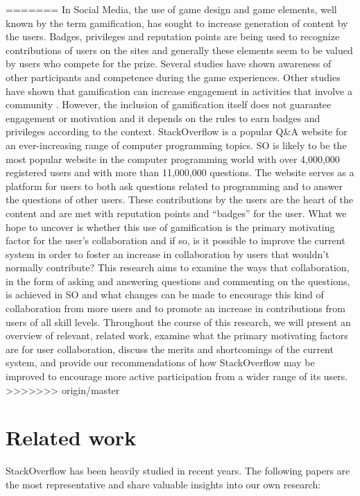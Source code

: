 \documentclass{sigchi}
\begin{document}
=======
In Social Media, the use of game design and game elements, well known by the term gamification, has sought to increase generation of content by the users. Badges, privileges and reputation points are being used to recognize contributions of users on the sites and generally these elements seem to be valued by users who compete for the prize. Several studies have shown awareness of other participants and competence during the game experiences\cite{Rughinis}. Other studies have shown that gamification can increase engagement in activities that involve a community \cite{Marder}. However, the inclusion of gamification itself does not guarantee engagement or motivation and it depends on the rules to earn badges and privileges  according to the context\cite{Deterding}.
StackOverflow is a popular Q&A website for an ever-increasing range of computer programming topics. SO is likely to be the most popular website in the computer programming world with over 4,000,000 registered users and with more than 11,000,000 questions. The website serves as a platform for users to both ask questions related to programming and to answer the questions of other users. These contributions by the users are the heart of the content and are met with reputation points and “badges” for the user. What we hope to uncover is whether this use of gamification is the primary motivating factor for the user’s collaboration and if so, is it possible to improve the current system in order to foster an increase in collaboration by users that wouldn’t normally contribute?
This research aims to examine the ways that collaboration, in the form of asking and answering questions and commenting on the questions, is achieved in SO and what changes can be made to encourage this kind of collaboration from more users and to promote an increase in contributions from users of all skill levels.
Throughout the course of this research, we will present an overview of relevant, related work, examine what the primary motivating factors are for user collaboration, discuss the merits and shortcomings of the current system, and provide our recommendations of how StackOverflow may be improved to encourage more active participation from a wider range of its users.
>>>>>>> origin/master

\section{Related work}
StackOverflow has been heavily studied in recent years. The following papers
are the most representative and share valuable insights into our own research:
\end{document}
